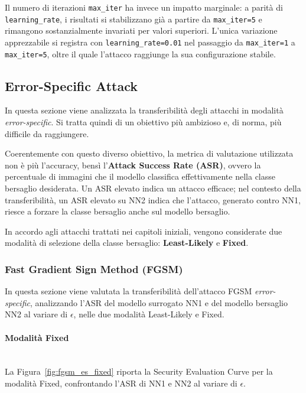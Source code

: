 \documentclass[a4paper, 12pt]{article}
\begin{document}
Il numero di iterazioni \texttt{max\_iter} ha invece un impatto marginale: a 
parità di \texttt{learning\_rate}, i risultati si stabilizzano già a partire da 
\texttt{max\_iter=5} e rimangono sostanzialmente invariati per valori superiori. 
L'unica variazione apprezzabile si registra con \texttt{learning\_rate=0.01} nel 
passaggio da \texttt{max\_iter=1} a \texttt{max\_iter=5}, oltre il quale l'attacco 
raggiunge la sua configurazione stabile.

\vspace{15pt}


\subsection{Error-Specific Attack}
In questa sezione viene analizzata la transferibilità degli attacchi in modalità 
\textit{error-specific}. Si tratta quindi di un obiettivo più ambizioso e, di norma, più difficile da 
raggiungere.

Coerentemente con questo diverso obiettivo, la metrica di valutazione utilizzata 
non è più l'accuracy, bensì l'\textbf{Attack Success Rate (ASR)}, ovvero la 
percentuale di immagini che il modello classifica effettivamente nella classe 
bersaglio desiderata. Un ASR elevato indica un attacco efficace; nel contesto 
della transferibilità, un ASR elevato su NN2 indica che l'attacco, generato 
contro NN1, riesce a forzare la classe bersaglio anche sul modello bersaglio.

In accordo agli attacchi trattati nei capitoli iniziali, vengono considerate due modalità di selezione della classe bersaglio: \textbf{Least-Likely} e \textbf{Fixed}.

\vspace{10pt}

\subsubsection{Fast Gradient Sign Method (FGSM)}
In questa sezione viene valutata la transferibilità dell'attacco FGSM 
\textit{error-specific}, analizzando l'ASR del modello surrogato NN1 e del modello 
bersaglio NN2 al variare di $\epsilon$, nelle due modalità Least-Likely e Fixed.

\paragraph*{Modalità Fixed}\mbox{}\\
La Figura~\ref{fig:fgsm_es_fixed} riporta la Security Evaluation Curve per la 
modalità Fixed, confrontando l'ASR di NN1 e NN2 al variare di $\epsilon$.
\end{document}
